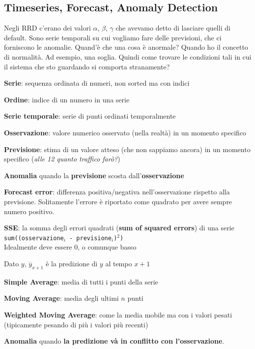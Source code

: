 \documentclass[10pt]{book}
\begin{document}
\subsection{Timeseries, Forecast, Anomaly Detection}
Negli RRD c'erano dei valori $\alpha$, $\beta$, $\gamma$ che avevamo detto di lasciare quelli di default. Sono serie temporali su cui vogliamo fare delle previsioni, che ci forniscono le anomalie. Quand'è che una cosa è anormale? Quando ho il concetto di normalità. Ad esempio, una soglia. Quindi come trovare le condizioni tali in cui il sistema che sto guardando si comporta stranamente?\\
\begin{list}{}{\textbf{Definizioni}:}
	\item \textbf{Serie}: sequenza ordinata di numeri, non sorted ma con indici
	\item \textbf{Ordine}: indice di un numero in una serie
	\item \textbf{Serie temporale}: serie di punti ordinati temporalmente
	\item \textbf{Osservazione}: valore numerico osservato (nella realtà) in un momento specifico
	\item \textbf{Previsione}: stima di un valore atteso (che non sappiamo ancora) in un momento specifico (\textit{alle 12 quanto traffico farò?})
	\item \textbf{Anomalia} quando la \textbf{previsione} scosta dall'\textbf{osservazione}
	\item \textbf{Forecast error}: differenza positiva/negativa nell'osservazione rispetto alla previsione. Solitamente l'errore è riportato come quadrato per avere sempre numero positivo.
	\item \textbf{SSE}: la somma degli errori quadrati (\textbf{sum of squared errors}) di una serie \texttt{sum((osservazione$_i$ - previsione$_i$)$^2$)}\\
	Idealmente deve essere 0, o comunque basso
	\item Dato $y$, $\overline{y}_{x+1}$ è la predizione di $y$ al tempo $x+1$
	\item \textbf{Simple Average}: media di tutti i punti della serie
	\item \textbf{Moving Average}: media degli ultimi $n$ punti
	\item \textbf{Weighted Moving Average}: come la media mobile ma con i valori pesati (tipicamente pesando di più i valori più recenti)
\end{list}
\textbf{Anomalia} quando \textbf{la predizione và in conflitto con l'osservazione}.
\end{document}
